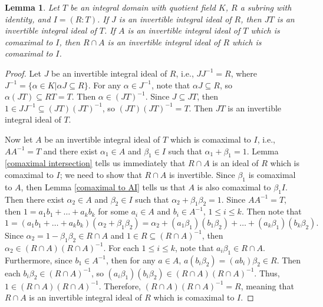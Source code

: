 \documentclass[12pt]{amsart}
\newtheorem{lemma}[theorem]{Lemma}
\theoremstyle{definition}
\begin{document}
\begin{lemma}
    \label{still invertible}
    Let $T$ be an integral domain with quotient field $K$, $R$ a subring with identity, and $I=(R:T)$. If $J$ is an invertible integral ideal of $R$, then $JT$ is an invertible integral ideal of $T$. If $A$ is an invertible integral ideal of $T$ which is comaximal to $I$, then $R\cap A$ is an invertible integral ideal of $R$ which is comaximal to $I$.
\end{lemma}

\begin{proof}
    Let $J$ be an invertible integral ideal of $R$, i.e., $JJ^{-1}=R$, where $J^{-1}=\{\alpha\in K|\alpha J\subseteq R\}$. For any $\alpha\in J^{-1}$, note that $\alpha J\subseteq R$, so $\alpha(JT)\subseteq RT=T$. Then $\alpha\in (JT)^{-1}$. Since $J\subseteq JT$, then $1\in JJ^{-1}\subseteq (JT)(JT)^{-1}$, so $(JT)(JT)^{-1}=T$. Then $JT$ is an invertible integral ideal of $T$.

    Now let $A$ be an invertible integral ideal of $T$ which is comaximal to $I$, i.e., $AA^{-1}=T$ and there exist $\alpha_1\in A$ and $\beta_1\in I$ such that $\alpha_1+\beta_1=1$. Lemma \ref{comaximal intersection} tells us immediately that $R\cap A$ is an ideal of $R$ which is comaximal to $I$; we need to show that $R\cap A$ is invertible. Since $\beta_1$ is comaximal to $A$, then Lemma \ref{comaximal to AI} tells us that $A$ is also comaximal to $\beta_1I$. Then there exist $\alpha_2\in A$ and $\beta_2\in I$ such that $\alpha_2+\beta_1\beta_2=1$. Since $AA^{-1}=T$, then $1=a_1b_1+\dots+a_kb_k$ for some $a_i\in A$ and $b_i\in A^{-1}$, $1\leq i\leq k$. Then note that 
    $$1=(a_1b_1+\dots+a_kb_k)(\alpha_2+\beta_1\beta_2)=\alpha_2+(a_1\beta_1)(b_1\beta_2)+\dots+(a_k\beta_1)(b_k\beta_2).$$
    Since $\alpha_2=1-\beta_1\beta_2\in R\cap A$ and $1\in R\subseteq (R\cap A)^{-1}$, then $\alpha_2\in (R\cap A)(R\cap A)^{-1}$. For each $1\leq i\leq k$, note that $a_i\beta_1\in R\cap A$. Furthermore, since $b_1\in A^{-1}$, then for any $a\in A$, $a(b_i\beta_2)=(ab_i)\beta_2\in R$. Then each $b_i\beta_2\in (R\cap A)^{-1}$, so $(a_i\beta_1)(b_i\beta_2)\in (R\cap A)(R\cap A)^{-1}$. Thus, $1\in (R\cap A)(R\cap A)^{-1}$. Therefore, $(R\cap A)(R\cap A)^{-1}=R$, meaning that $R\cap A$ is an invertible integral ideal of $R$ which is comaximal to $I$.
\end{proof}
\end{document}
